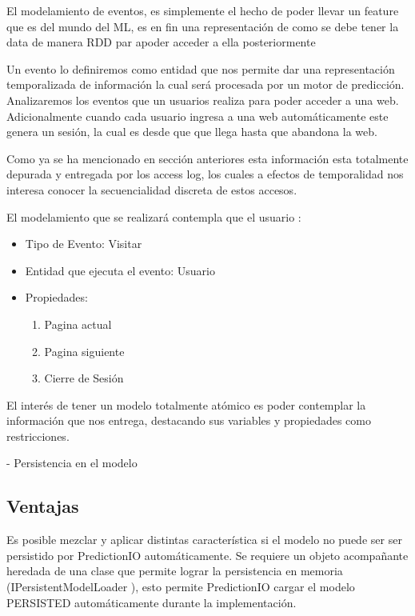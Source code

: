 El modelamiento de eventos, es simplemente el hecho de poder llevar un feature  que es del mundo del ML, es en fin una representación de como se debe tener la data de manera RDD par apoder acceder a ella posteriormente 

Un evento lo definiremos como entidad que nos permite dar una representación temporalizada de información la cual será procesada por un motor de predicción. Analizaremos los eventos que un usuarios realiza para poder acceder a una web. Adicionalmente cuando cada usuario ingresa a una web automáticamente este genera un sesión, la cual es desde que que llega hasta que abandona la web.

Como ya se ha mencionado en sección anteriores esta información esta totalmente depurada y entregada por los access log, los cuales a efectos de temporalidad nos interesa conocer la secuencialidad discreta de estos accesos.



  El modelamiento que se realizará contempla que el usuario :


    \begin{itemize}
      \item Tipo de Evento: Visitar
      \item Entidad que ejecuta el evento: Usuario
      \item Propiedades:
          \begin{enumerate}
            \item Pagina actual
            \item Pagina siguiente
            \item Cierre de Sesión
          \end{enumerate}
    \end{itemize}



    El interés de tener un modelo totalmente atómico es poder contemplar la información que nos entrega, destacando sus variables y propiedades como restricciones.


    - Persistencia en el modelo


\subsection{Ventajas }


  Es posible mezclar y aplicar distintas característica si el modelo no puede ser ser persistido por PredictionIO automáticamente. Se requiere un objeto acompañante heredada de una clase que permite lograr la persistencia en memoria (IPersistentModelLoader ), esto permite PredictionIO  cargar el modelo PERSISTED automáticamente durante la implementación.


